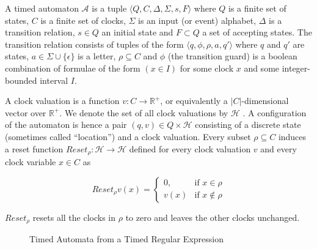 \documentclass[]{sigplanconf}
\begin{document}
\begin{defns}
A timed automaton  $\mathcal{A}$ is a tuple $\langle Q,C,\Delta ,\Sigma, s,F\rangle$ where $Q$ is a finite set of states, $C$ is a finite set of clocks, $\Sigma$ is an input (or event) alphabet, $\Delta$ is a transition relation, $s \in Q$ an initial state and $F \subset Q$ a set of accepting states. The transition relation consists of tuples of the form $\langle q ,\phi ,\rho, a, q' \rangle$ where $q$ and $q'$  are states, $a \in \Sigma \cup \{\epsilon \}$ is a letter, $\rho \subseteq C$ and $\phi$ (the transition guard) is a boolean combination of formulae of the form $(x \in I)$ for some clock $x$ and some integer-bounded interval $I$.
\end{defns}

A clock valuation is a function $v \colon C \rightarrow \mathbb{R}^+$, or equivalently a $|C|$-dimensional vector over $\mathbb{R}^+$. We denote the set of all clock valuations by $\mathcal{H}$ . A configuration of the automaton is hence a pair $(q,v) \in Q \times \mathcal{H}$ consisting of a discrete state (sometimes called “location”) and a clock valuation. Every subset $\rho \subseteq C$ induces a reset function $Reset_\rho : \mathcal{H} \rightarrow \mathcal{H}$ defined for every clock valuation $v$ and every clock variable $x \in C$ as

\begin{equation}\label{timed_automaton}
Reset_\rho v(x) = \begin{cases}
0, & \text{if $x \in \rho$} \\
v(x) &\text{if $x \notin \rho$}
\end{cases}
\end{equation}

$Reset_\rho$ resets all the clocks in $\rho$ to zero and leaves the other clocks unchanged.

\begin{figure}
\caption{Timed Automata from a Timed Regular Expression}
\label{fig:tretoautomata}
\end{figure}
\end{document}
